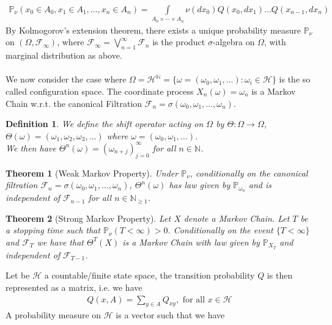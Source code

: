 \documentclass[11pt,a4paper, final]{article}
\newtheorem{thm}{Theorem}[section]
\newtheorem{defn}{Definition}[section]
\theoremstyle{definition}
\begin{document}
\begin{align*}
\mathbb{P}_\nu ( x_0 \in A_0 , x_1 \in A_1, \dots , x_n \in A_n ) = \int \limits_{A_0 \times \cdots \times A_n} \nu (dx_0) Q(x_0,dx_1) \dots Q(x_{n-1}, dx_n)
\end{align*}
By Kolmogorov's extension theorem, there exists a unique probability measure $\mathbb{P}_\nu$ on $( \Omega, \mathcal{F}_\infty)$, where $\mathcal{F}_\infty = \bigvee_{n=1}^\infty \mathcal{F}_n$ is the product $\sigma$-algebra on $\Omega$, with marginal distribution as above. 
\\\\
We now consider the case where $\Omega = \mathcal{H}^\mathbb{N}= \lbrace  \omega = ( \omega_0, \omega_1, \dots ) : \omega_i \in \mathcal{H} \rbrace$ is the so called configuration space. The coordinate process $X_n( \omega)= \omega_n$ is a Markov Chain w.r.t. the canonical Filtration $\mathcal{F}_n = \sigma( \omega_0, \omega_1, \dots , \omega_n)$.  
\begin{defn} We define the shift operator acting on $\Omega$ by $\Theta :\Omega \to \Omega$, $\Theta(\omega)=( \omega_1, \omega_2, \omega_3, \dots )$ where $\omega=( \omega_0, \omega_1, \dots )$. \\ We then have $\Theta^n( \omega) = ( \omega_{n+j})_{j=0}^\infty$ for all $n \in \mathbb{N}$.
\end{defn}
\begin{thm}[Weak Markov Property] Under $\mathbb{P}_\nu$, conditionally on the canonical filtration $\mathcal{F}_n= \sigma( \omega_0, \omega_1, \dots , \omega_n)$, $\Theta^n ( \omega)$ has law given by $\mathbb{P}_{\omega_n}$ and is independent of $\mathcal{F}_{n-1}$ for all $n \in \mathbb{N}_{ \geq 1}$. 
\end{thm}
\begin{thm}[Strong Markov Property] Let $X$ denote a Markov Chain. Let $T$ be a stopping time such that $\mathbb{P}_\nu (T < \infty) >0 $. Conditionally on the event $\lbrace T < \infty \rbrace$ and $\mathcal{F}_T$ we have that $\Theta^T (X)$ is a Markov Chain with law given by $\mathbb{P}_{X_T}$ and independent of $\mathcal{F}_{T-1}$.
\end{thm}
Let be $\mathcal{H}$ a countable/finite state space, the transition probability $Q$ is then represented as a matrix, i.e. we have 
\begin{align*}
Q(x,A) = \sum_{y \in A} Q_{xy}, \text{ for all } x \in \mathcal{H}
\end{align*}
A probability measure on $\mathcal{H}$ is a vector such that we have 
\end{document}
